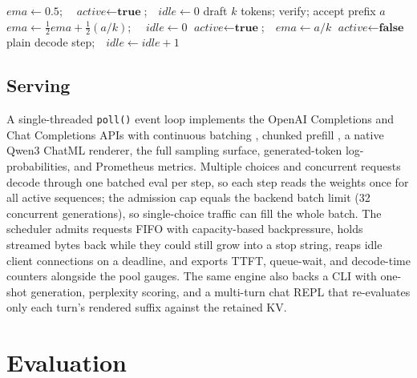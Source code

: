 \documentclass[sigconf,nonacm,screen]{acmart}
\newcommand{\code}[1]{\texttt{\small #1}}
\begin{document}
\begin{algorithm}[t]
\caption{Adaptive speculation gating (per decode step)}
\label{alg:gate}
\begin{algorithmic}[1]
\State $\textit{ema} \gets 0.5$;\ \ $\textit{active} \gets \textbf{true}$;\ \
       $\textit{idle} \gets 0$
    \State draft $k$ tokens; verify; accept prefix $a$
    \State $\textit{ema} \gets \tfrac{1}{2}\textit{ema} + \tfrac{1}{2}(a/k)$;
           \ \ $\textit{idle} \gets 0$
       \State $\textit{active} \gets \textbf{true}$;\ \
              $\textit{ema} \gets a/k$
    \ElsIf{$\textit{ema} < 0.2$}
       \State $\textit{active} \gets \textbf{false}$
    \EndIf
  \Else
    \State plain decode step;\ \ $\textit{idle} \gets \textit{idle} + 1$
  \EndIf
\EndFor
\end{algorithmic}
\end{algorithm}

\subsection{Serving}
\label{sec:impl-serving}
A single-threaded \code{poll()} event loop implements the OpenAI Completions
and Chat Completions APIs with continuous batching \citep{yu2022orca},
chunked prefill \citep{agrawal2024sarathi}, a native Qwen3 ChatML renderer,
the full sampling surface, generated-token log-probabilities, and Prometheus
metrics. Multiple choices and concurrent requests decode through one batched
eval per step, so each step reads the weights once for all active sequences;
the admission cap equals the backend batch limit (32 concurrent
generations), so single-choice traffic can fill the whole batch.
The scheduler admits requests FIFO with capacity-based backpressure, holds
streamed bytes back while they could still grow into a stop string, reaps
idle client connections on a deadline, and exports TTFT, queue-wait, and
decode-time counters alongside the pool gauges. The same engine also backs
a CLI with one-shot generation, perplexity scoring, and a multi-turn chat
REPL that re-evaluates only each turn's rendered suffix against the
retained KV.

\section{Evaluation}
\label{sec:eval}
\end{document}
